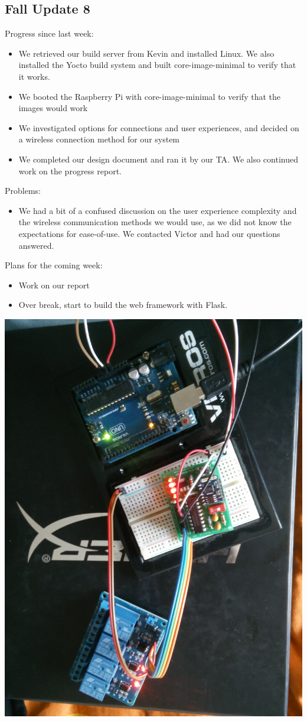 \subsection{Fall Update 8}
Progress since last week:
\begin{itemize}
\item We retrieved our build server from Kevin and installed Linux. We also installed the Yocto build system and built core-image-minimal to verify that it works. 
\item We booted the Raspberry Pi with core-image-minimal to verify that the images would work
\item We investigated options for connections and user experiences, and decided on a wireless connection method for our system
\item We completed our design document and ran it by our TA. We also continued work on the progress report.
\end{itemize}
Problems:
\begin{itemize}
\item We had a bit of a confused discussion on the user experience complexity and the wireless communication methods we would use, as we did not know the expectations for ease-of-use. We contacted Victor and had our questions answered.
\end{itemize}
Plans for the coming week: 
\begin{itemize}
\item Work on our report
\item Over break, start to build the web framework with Flask. 
\end{itemize}
\includegraphics[scale=0.05]{circuit1}\\

